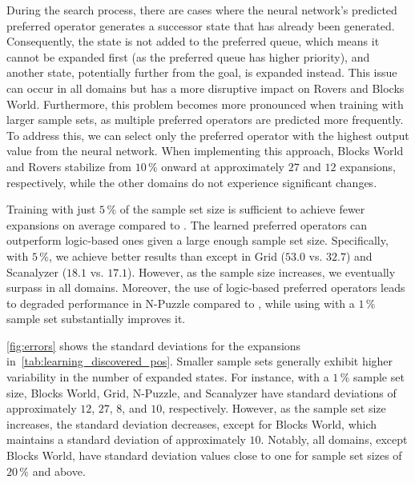 \documentclass[ppgc,diss,english]{iiufrgs}
\begin{document}
During the search process, there are cases where the neural network's predicted preferred operator generates a successor state that has already been generated. Consequently, the state is not added to the preferred queue, which means it cannot be expanded first (as the preferred queue has higher priority), and another state, potentially further from the goal, is expanded instead. This issue can occur in all domains but has a more disruptive impact on Rovers and Blocks World. Furthermore, this problem becomes more pronounced when training with larger sample sets, as multiple preferred operators are predicted more frequently. To address this, we can select only the preferred operator with the highest output value from the neural network. When implementing this approach, Blocks World and Rovers stabilize from $10\,\%$ onward at approximately $27$ and $12$ expansions, respectively, while the other domains do not experience significant changes. %

Training with just $5\,\%$ of the sample set size is sufficient to achieve fewer expansions on average compared to \poff. The learned preferred operators \pog can outperform logic-based ones given a large enough sample set size. Specifically, with $5\,\%$, we achieve better results than \poff except in Grid ($53.0$ vs. $32.7$) and Scanalyzer ($18.1$ vs. $17.1$). However, as the sample size increases, we eventually surpass \poff in all domains. Moreover, the use of logic-based preferred operators \poff leads to degraded performance in N-Puzzle compared to \hnn, while using \pog with a $1\,\%$ sample set substantially improves it.

\cref{fig:errors} shows the standard deviations for the expansions in~\cref{tab:learning_discovered_pos}. Smaller sample sets generally exhibit higher variability in the number of expanded states. For instance, with a $1\,\%$ sample set size, Blocks World, Grid, N-Puzzle, and Scanalyzer have standard deviations of approximately $12$, $27$, $8$, and $10$, respectively. However, as the sample set size increases, the standard deviation decreases, except for Blocks World, which maintains a standard deviation of approximately $10$. Notably, all domains, except Blocks World, have standard deviation values close to one for sample set sizes of $20\,\%$ and above.
\end{document}
